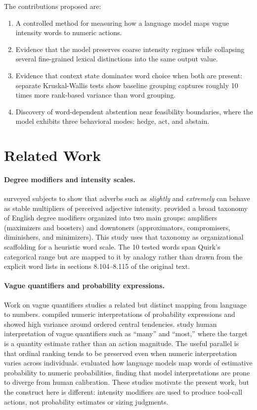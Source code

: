 \documentclass[11pt]{article}
\begin{document}
The contributions proposed are:
\begin{enumerate}
    \item A controlled method for measuring how a language model maps vague intensity words to numeric actions.
    \item Evidence that the model preserves coarse intensity regimes while collapsing several fine-grained lexical distinctions into the same output value.
    \item Evidence that context state dominates word choice when both are present: separate Kruskal-Wallis tests show baseline grouping captures roughly 10 times more rank-based variance than word grouping.
    \item Discovery of word-dependent abstention near feasibility boundaries, where the model exhibits three behavioral modes: hedge, act, and abstain.
\end{enumerate}

\section{Related Work}

\paragraph{Degree modifiers and intensity scales.}
\citet{cliff1959} surveyed subjects to show that adverbs such as \textit{slightly} and \textit{extremely} can behave as stable multipliers of perceived adjective intensity. \citet{quirk1985} provided a broad taxonomy of English degree modifiers organized into two main groups: amplifiers (maximizers and boosters) and downtoners (approximators, compromisers, diminishers, and minimizers). This study uses that taxonomy as organizational scaffolding for a heuristic word scale. The 10 tested words span Quirk's categorical range but are mapped to it by analogy rather than drawn from the explicit word lists in sections 8.104--8.115 of the original text.

\paragraph{Vague quantifiers and probability expressions.}
Work on vague quantifiers studies a related but distinct mapping from language to numbers. \citet{mosteller1990} compiled numeric interpretations of probability expressions and showed high variance around ordered central tendencies. \citet{ramotowska2024} study human interpretation of vague quantifiers such as ``many'' and ``most,'' where the target is a quantity estimate rather than an action magnitude. The useful parallel is that ordinal ranking tends to be preserved even when numeric interpretation varies across individuals. \citet{zhang2024} evaluated how language models map words of estimative probability to numeric probabilities, finding that model interpretations are prone to diverge from human calibration. These studies motivate the present work, but the construct here is different: intensity modifiers are used to produce tool-call actions, not probability estimates or sizing judgments.
\end{document}
